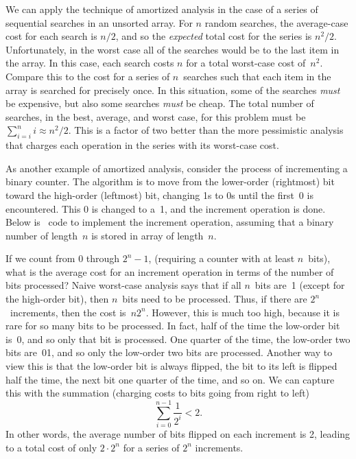 We can apply the technique of amortized analysis in the case of
a series of sequential searches in an unsorted
array.
For $n$ random searches, the average-case cost for each search is
$n/2$, and so the \emph{expected} total cost for the series is $n^2/2$.
Unfortunately, in the worst case all of the searches would
be to the last item in the array.
In this case, each search costs $n$ for a total worst-case cost
of~$n^2$.
Compare this to the cost for a series of $n$~searches such that each
item in the array is searched for precisely once.
In this situation, some of the searches \emph{must} be expensive, but
also some searches \emph{must} be cheap.
The total number of searches, in the best, average, and worst case,
for this problem must be
\(\sum_{i=i}^n i \approx n^2/2\). 
This is a factor of two better than the more pessimistic analysis that
charges each operation in the series with its worst-case cost.

As another example of amortized analysis, consider the process of
incrementing a binary counter.
The algorithm is to move from the lower-order (rightmost) bit toward
the high-order (leftmost) bit, changing 1s to 0s until the first~0
is encountered.
This 0 is changed to a~1, and the increment operation is done.
Below is \Lang\ code to implement the increment operation,
assuming that a binary number of length~$n$ is stored in array
 of length~$n$.


If we count from 0 through $2^n - 1$, (requiring a counter with at
least $n$~bits), what is the average cost for an increment operation
in terms of the number of bits processed?
Naive worst-case analysis says that if all $n$~bits are~1 (except for
the high-order bit), then $n$~bits need to be processed.
Thus, if there are $2^n$~increments, then the cost is~$n 2^n$.
However, this is much too high, because it is rare for so many bits to
be processed.
In fact, half of the time the low-order bit is~0, and so only that
bit is processed.
One quarter of the time, the low-order two bits are~01, and so
only the low-order two bits are processed.
Another way to view this is that the low-order bit is always flipped,
the bit to its left is flipped half the time,
the next bit one quarter of the time, and so on.
We can capture this with the summation (charging costs to bits going
from right to left)
\[\sum_{i=0}^{n-1} \frac{1}{2^i} < 2.\]
\noindent In other words, the average number of bits flipped on each
increment is 2, leading to a total cost of only $2 \cdot 2^n$ for
a series of $2^n$ increments.

